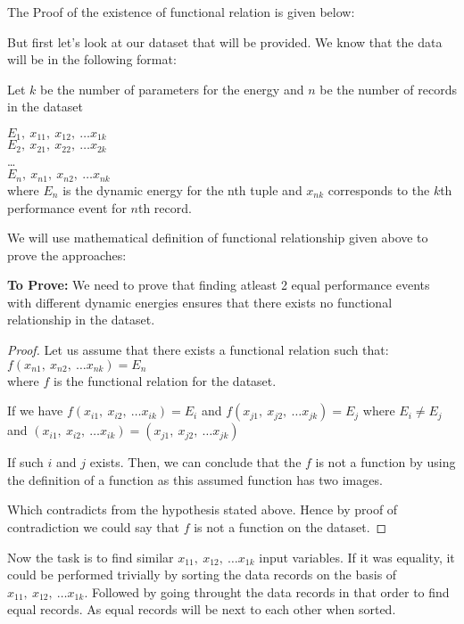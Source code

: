 The Proof of the existence of functional relation is given below:

But first let's look at our dataset that will be provided.
We know that the data will be in the following format:

Let \(k\) be the number of parameters for the energy and \(n\) be the number of records in the dataset

\(E_1,\ x_{11},\ x_{12},\ \ldots x_{1k}\)\\
\(E_2,\ x_{21},\ x_{22},\ \ldots x_{2k}\)\\
\ldots\\
\(E_n,\ x_{n1},\ x_{n2},\ \ldots x_{nk}\)\\
where \(E_n\) is the dynamic energy for the nth tuple and \(x_{nk}\) corresponds to the \(k\)th performance event for \(n\)th record.

We will use mathematical definition of functional relationship given above to prove the approaches:

\textbf{To Prove:} We need to prove that finding atleast 2 equal performance events with different dynamic energies ensures that there exists no functional relationship in the dataset.

\begin{proof}
	Let us assume that there exists a functional relation such that:\\
	\(f(x_{n1},\ x_{n2},\ \ldots x_{nk}) = E_n\)\\
	where \(f\) is the functional relation for the dataset.

	If we have \(f(x_{i1},\ x_{i2},\ \ldots x_{ik}) = E_i\) and \(f(x_{j1},\ x_{j2},\ \ldots x_{jk}) = E_j\)
	where \(E_i \neq E_j\) and \((x_{i1},\ x_{i2},\ \ldots x_{ik}) = (x_{j1},\ x_{j2},\ \ldots x_{jk})\)

	If such \(i\) and \(j\) exists. Then, we can conclude that the \(f\) is not a function by using the definition of a function as this assumed function has two images.

	Which contradicts from the hypothesis stated above.
	Hence by proof of contradiction we could say that \(f\) is not a function on the dataset.
\end{proof}

Now the task is to find similar \(x_{11},\ x_{12},\ \ldots x_{1k}\) input variables. If it was equality, it could be performed trivially by sorting the data records on the basis of \(x_{11},\ x_{12},\ \ldots x_{1k}\). Followed by going throught the data records in that order to find equal records. As equal records will be next to each other when sorted.

